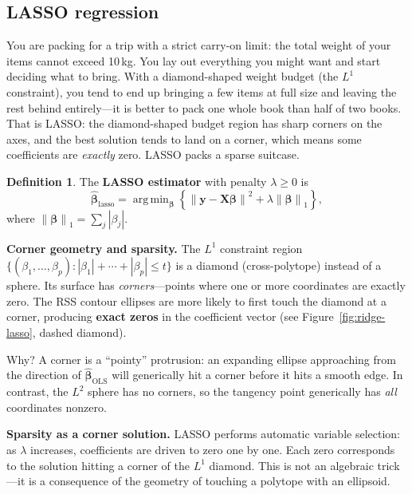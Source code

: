 \documentclass[11pt,a4paper]{article}
\theoremstyle{plain}
\theoremstyle{definition}
\newtheorem{definition}[theorem]{Definition}
\newcommand{\bhat}{\hat{\bm{\beta}}}
\newcommand{\bX}{\bm{X}}
\newcommand{\by}{\bm{y}}
\newcommand{\norm}[1]{\left\lVert #1 \right\rVert}
\DeclareMathOperator*{\argmin}{arg\,min}
\begin{document}
\subsection{LASSO regression}

\begin{toystory}
You are packing for a trip with a strict carry-on limit: the total
weight of your items cannot exceed 10\,kg.  You lay out everything you
might want and start deciding what to bring.  With a diamond-shaped
weight budget (the $L^1$ constraint), you tend to end up bringing a
few items at full size and leaving the rest behind entirely---it is
better to pack one whole book than half of two books.  That is LASSO:
the diamond-shaped budget region has sharp corners on the axes, and the
best solution tends to land on a corner, which means some coefficients
are \emph{exactly} zero.  LASSO packs a sparse suitcase.
\end{toystory}

\begin{definition}
The \textbf{LASSO estimator} with penalty $\lambda\ge 0$ is
\[
  \bhat_{\text{lasso}}
  = \argmin_{\bm{\beta}}\left\{
      \norm{\by-\bX\bm{\beta}}^2 + \lambda\norm{\bm{\beta}}_1
    \right\},
\]
where $\norm{\bm{\beta}}_1 = \sum_j|\beta_j|$.
\end{definition}

\noindent\textbf{Corner geometry and sparsity.}
The $L^1$ constraint region
$\{(\beta_1,\dots,\beta_p) : |\beta_1|+\cdots+|\beta_p| \le t\}$
is a diamond (cross-polytope) instead of a sphere.
Its surface has \emph{corners}---points where one or more coordinates
are exactly zero.
The RSS contour ellipses are more likely to first touch the diamond
at a corner, producing \textbf{exact zeros} in the coefficient vector
(see Figure~\ref{fig:ridge-lasso}, dashed diamond).

Why?
A corner is a ``pointy'' protrusion: an expanding ellipse approaching
from the direction of $\bhat_{\text{OLS}}$ will generically hit a
corner before it hits a smooth edge.
In contrast, the $L^2$ sphere has no corners, so the tangency point
generically has \emph{all} coordinates nonzero.

\medskip
\noindent\textbf{Sparsity as a corner solution.}
LASSO performs automatic variable selection: as $\lambda$ increases,
coefficients are driven to zero one by one.
Each zero corresponds to the solution hitting a corner of the $L^1$
diamond.
This is not an algebraic trick---it is a consequence of the geometry
of touching a polytope with an ellipsoid.
\end{document}
